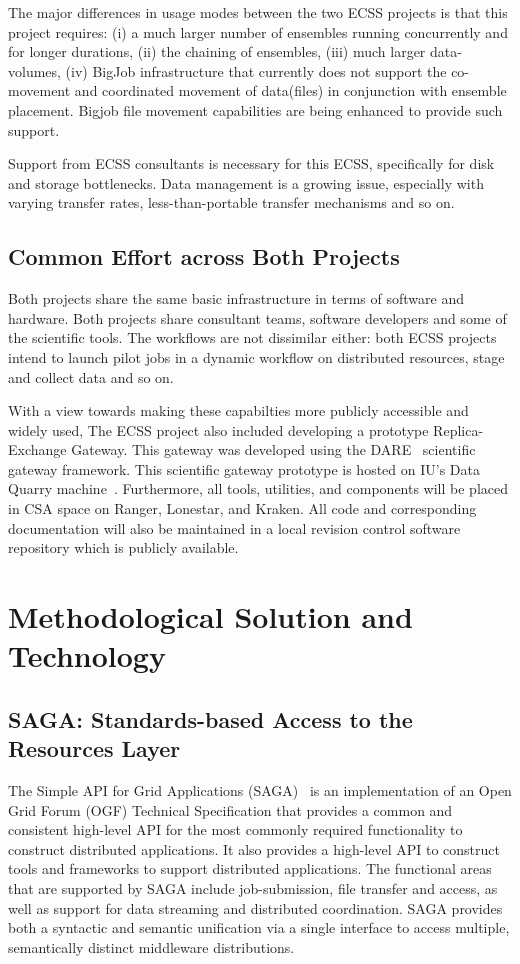 \documentclass{sig-alternate}
\begin{document}
The major differences in usage modes between the two ECSS projects is that this
project requires: (i) a much larger number of ensembles running concurrently and
for longer durations, (ii) the chaining of ensembles, (iii) much larger
data-volumes, (iv)  BigJob infrastructure that currently does not support the
co-movement and coordinated movement of data(files) in conjunction with ensemble
placement. Bigjob file movement capabilities are being enhanced to provide
such support.

Support from ECSS consultants is necessary for this ECSS, specifically for disk
and storage bottlenecks. Data management is a growing issue, especially with
varying transfer rates, less-than-portable transfer mechanisms and so on.

\subsection{Common Effort across Both Projects}

Both projects share the same basic infrastructure in terms of software and
hardware. Both projects share consultant teams, software developers and some of
the scientific tools. The workflows are not dissimilar either: both ECSS
projects intend to launch pilot jobs in a dynamic workflow on distributed
resources, stage and collect data and so on.

With a view towards making these capabilties more publicly accessible and
widely used, The ECSS project also included developing a prototype
Replica-Exchange Gateway. This gateway was developed using the DARE~\cite{DARE}
scientific gateway framework. This scientific gateway prototype is hosted
on IU's Data Quarry machine~\cite{DataQuarry}. Furthermore, all tools,
utilities, and components will be placed in CSA space on Ranger,
Lonestar, and Kraken. All code and corresponding documentation will also be
maintained in a local revision control software repository which is publicly
available.


\section{Methodological Solution and Technology}


\subsection{SAGA: Standards-based Access to the Resources Layer}

The Simple API for Grid Applications (SAGA)~\cite{saga_url} is an
implementation of an Open Grid Forum (OGF) Technical Specification
that provides a common and consistent high-level API for the most
commonly required functionality to construct distributed applications.
It also provides a high-level API to construct tools and frameworks to
support distributed applications. The functional areas that are
supported by SAGA include job-submission, file transfer and access, as
well as support for data streaming and distributed coordination. SAGA
provides both a syntactic and semantic unification via a single
interface to access multiple, semantically distinct middleware
distributions.
\end{document}

